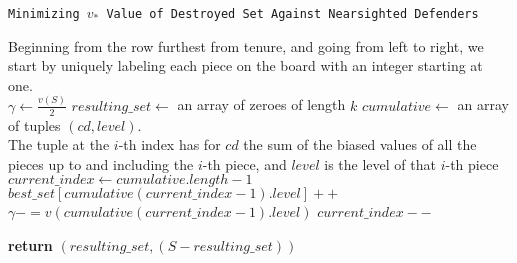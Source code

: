 \documentclass{article}
\theoremstyle{plain}
\theoremstyle{definition}
\theoremstyle{remark}
\begin{document}
\begin{center}
  \begin{minipage}{1\linewidth} %
    \begin{algorithm}[H]

      \caption{\texttt{Minimizing $v_{*}$ Value of Destroyed Set Against Nearsighted Defenders}} %
      \label{alg:farsighted}   %

  \medskip
	Beginning from the row furthest from tenure, and going from left to right, we start by uniquely labeling each piece on the board with an integer starting at one.\\
      \medskip
      $\gamma \leftarrow \frac{v(S)}{2}$\;
      $resulting\_set \leftarrow$ an array of zeroes of length $k$\;
      $cumulative \leftarrow$ an array of tuples $(cd, level)$. \\ The tuple at the $i$-th index has for $cd$ the sum of the biased values of all the pieces up to and including the $i$-th piece, and $level$ is the level of that $i$-th piece\;
      $current\_index \leftarrow cumulative.length - 1$\;
      \medskip
{} {
		 {
			$best\_set[cumulative(current\_index - 1).level]{+}{+}$\;
			$\gamma {-}{=} v(cumulative(current\_index - 1).level)$\;
		}
		$current\_index{-}{-}$\;
      }
    
     \medskip
      {\bf return} $(resulting\_set, (S - resulting\_set))$\;
    \end{algorithm}
  \end{minipage}
\end{center}
\end{document}
